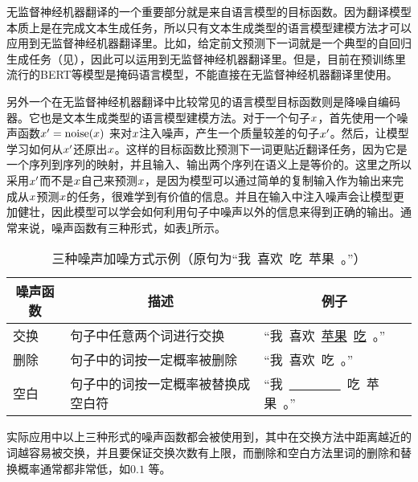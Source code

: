 
\parinterval 无监督神经机器翻译的一个重要部分就是来自语言模型的目标函数。因为翻译模型本质上是在完成文本生成任务，所以只有文本生成类型的语言模型建模方法才可以应用到无监督神经机器翻译里。比如，给定前文预测下一词就是一个典型的自回归生成任务（见{\chaptertwo}），因此可以运用到无监督神经机器翻译里。但是，目前在预训练里流行的BERT等模型是掩码语言模型，不能直接在无监督神经机器翻译里使用。

\parinterval 另外一个在无监督神经机器翻译中比较常见的语言模型目标函数则是降噪自编码器。它也是文本生成类型的语言模型建模方法。对于一个句子${x}$，首先使用一个噪声函数${x}'=\mathrm{noise}({x})$ 来对${x}$注入噪声，产生一个质量较差的句子${x}'$。然后，让模型学习如何从${x}'$还原出${x}$。这样的目标函数比预测下一词更贴近翻译任务，因为它是一个序列到序列的映射，并且输入、输出两个序列在语义上是等价的。这里之所以采用${x}'$而不是${x}$自己来预测${x}$，是因为模型可以通过简单的复制输入作为输出来完成从${x}$预测${x}$的任务，很难学到有价值的信息。并且在输入中注入噪声会让模型更加健壮，因此模型可以学会如何利用句子中噪声以外的信息来得到正确的输出。通常来说，噪声函数有三种形式，如表\ref{tab:16-1}所示。
\begin{table}[h]
\centering
\caption{三种噪声加噪方式示例（原句为``我\ 喜欢\ 吃\ 苹果\ 。''）}
\begin{tabular}{l|l|l}
\multicolumn{1}{c|}{噪声函数} & \multicolumn{1}{c|}{描述} & \multicolumn{1}{c}{例子} \\
\hline
\rule{0pt}{15pt}交换 & 句子中任意两个词进行交换 & ``我\ 喜欢\ \underline{苹果}\ \underline{吃}\ 。'' \\
\rule{0pt}{15pt}删除 & 句子中的词按一定概率被删除 & ``我\ 喜欢\ 吃\ 。'' \\
\rule{0pt}{15pt}空白 & 句子中的词按一定概率被替换成空白符 & ``我\ \underline{\ \ \ \ \ \ \ \ }\ 吃\ 苹果\ 。'' \\
\end{tabular}
\label{tab:16-1}
\end{table}

\parinterval 实际应用中以上三种形式的噪声函数都会被使用到，其中在交换方法中距离越近的词越容易被交换，并且要保证交换次数有上限，而删除和空白方法里词的删除和替换概率通常都非常低，如$0.1$ 等。


